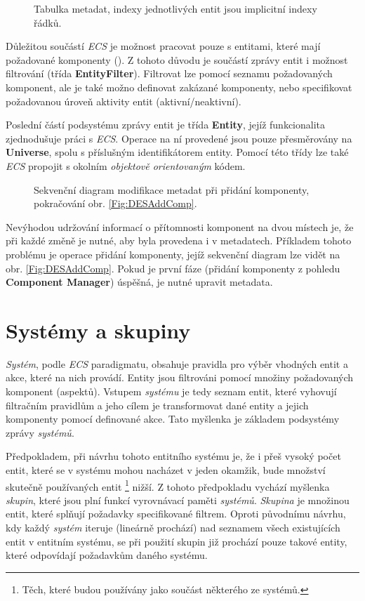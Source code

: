 \begin{figure}
	\caption{Tabulka metadat, indexy jednotlivých entit jsou implicitní indexy řádků.}
	\label{Fig:DESMetadata}
\end{figure}

Důležitou součástí \emph{ECS} je možnost pracovat pouze s entitami, které mají požadované komponenty (). Z tohoto důvodu je součástí zprávy entit i možnost filtrování (třída \textbf{EntityFilter}). Filtrovat lze pomocí seznamu požadovaných komponent, ale je také možno definovat zakázané komponenty, nebo specifikovat požadovanou úroveň aktivity entit (aktivní/neaktivní).

Poslední částí podsystému zprávy entit je třída \textbf{Entity}, jejíž funkcionalita zjednodušuje práci s \emph{ECS}. Operace na ní provedené jsou pouze přesměrovány na \textbf{Universe}, spolu s příslušným identifikátorem entity. Pomocí této třídy lze také \emph{ECS} propojit s okolním \emph{objektově orientovaným} kódem.

\begin{figure}[H]
	\caption{Sekvenční diagram modifikace metadat při přidání komponenty, pokračování obr. \ref{Fig:DESAddComp}.}
	\label{Fig:DESAddEnt}
\end{figure}

Nevýhodou udržování informací o přítomnosti komponent na dvou místech je, že při každé změně je nutné, aby byla provedena i v metadatech. Příkladem tohoto problému je operace přidání komponenty, jejíž sekvenční diagram lze vidět na obr. \ref{Fig:DESAddComp}. Pokud je první fáze (přidání komponenty z pohledu \textbf{Component Manager}) úspěšná, je nutné upravit metadata.

\section{Systémy a skupiny}
\label{Chap:SysGroup}

\emph{Systém}, podle \emph{ECS} paradigmatu, obsahuje pravidla pro výběr vhodných entit a akce, které na nich provádí. Entity jsou filtrováni pomocí množiny požadovaných komponent (aspektů). Vstupem \emph{systému} je tedy seznam entit, které vyhovují filtračním pravidlům a jeho cílem je transformovat dané entity a jejich komponenty pomocí definované akce. Tato myšlenka je základem podsystémy zprávy \emph{systémů}. 

Předpokladem, při návrhu tohoto entitního systému je, že i přeš vysoký počet entit, které se v systému mohou nacházet v jeden okamžik, bude množství skutečně používaných entit \footnote{Těch, které budou používány jako součást některého ze systémů.} nižší. Z tohoto předpokladu vychází myšlenka \emph{skupin}, které jsou plní funkcí vyrovnávací paměti \emph{systémů}. \emph{Skupina} je množinou entit, které splňují požadavky specifikované filtrem. Oproti původnímu návrhu, kdy každý \emph{systém} iteruje (lineárně prochází) nad seznamem všech existujících entit v entitním systému, se při použití skupin již prochází pouze takové entity, které odpovídají požadavkům daného systému.

